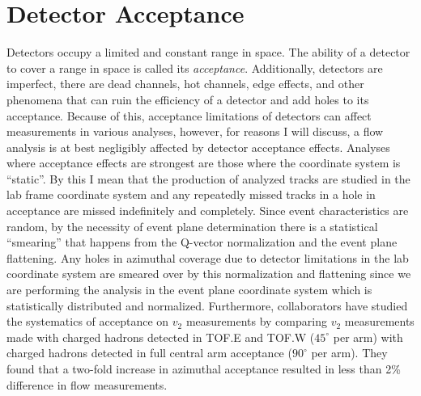 \section{Detector Acceptance}
\label{sectaccepterr}
Detectors occupy a limited and constant range in space. The ability of a detector to cover a range in space is called its \textit{acceptance}. Additionally, detectors are imperfect, there are dead channels, hot channels, edge effects, and other phenomena that can ruin the efficiency of a detector and add holes to its acceptance. Because of this, acceptance limitations of detectors can affect measurements in various analyses, however, for reasons I will discuss, a flow analysis is at best negligibly affected by detector acceptance effects. Analyses where acceptance effects are strongest are those where the coordinate system is ``static''. By this I mean that the production of analyzed tracks are studied in the lab frame coordinate system and any repeatedly missed tracks in a hole in acceptance are missed indefinitely and completely. Since event characteristics are random, by the necessity of event plane determination there is a statistical ``smearing'' that happens from the Q-vector normalization and the event plane flattening. Any holes in azimuthal coverage due to detector limitations in the lab coordinate system are smeared over by this normalization and flattening since we are performing the analysis in the event plane coordinate system which is statistically distributed and normalized. Furthermore, collaborators have studied the systematics of acceptance on $v_2$ measurements\citep{azianisystematics} by comparing $v_2$ measurements made with charged hadrons detected in TOF.E and TOF.W ($45^{\circ}$ per arm) with charged hadrons detected in full central arm acceptance ($90^{\circ}$ per arm). They found that a two-fold increase in azimuthal acceptance resulted in less than 2\% difference in flow measurements. 

